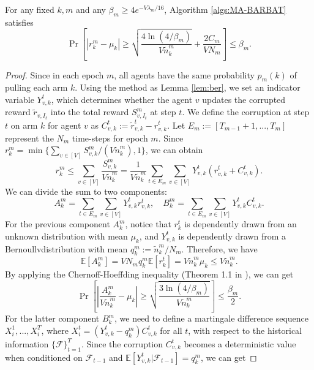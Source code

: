 \begin{lemma}
\label{lem:berm} %
    For any fixed $k,m$ and any $\beta_m \geq 4e^{-V\lambda_m/16}$, Algorithm \ref{algs:MA-BARBAT} satisfies
    \[\Pr\left[|r_k^m - \mu_k| \geq \sqrt{\frac{4\ln(4/\beta_m)}{V \widetilde{n}_k^m}} + \frac{2C_m}{V N_m}\right] \leq \beta_m.\]
\end{lemma}
\begin{proof}
    Since in each epoch $m$, all agents have the same probability $p_m(k)$ of pulling each arm $k$. Using the method as Lemma \ref{lem:ber}, we set an indicator variable $Y_{v,k}^t$, which determines whether the agent $v$ updates the corrupted reward $\widetilde{r}_{v,I_t}$ into the total reward $S_{v,I_t}^m$ at step $t$. We define the corruption at step $t$ on arm $k$ for agent $v$ as $C_{v,k}^t := \widetilde{r}_{v,k}^t - r_{v,k}^t$. Let $E_m := [T_{m-1} + 1,...,T_m]$ represent the $N_m$ time-steps for epoch $m$. Since $r_k^m = \min\{\sum_{v\in [V]}S_{v,k}^m / (V \widetilde{n}_k^m), 1\}$, we can obtain
    \[r_k^m \leq \sum_{v\in [V]}\frac{S_{v,k}^m}{V \widetilde{n}_k^m} = \frac{1}{V \widetilde{n}_k^m}\sum_{t \in E_m}\sum_{v\in [V]}Y_{v,k}^t (r_{v,k}^t + C_{v,k}^t).\]
    We can divide the sum to two components:
    \[A_k^m = \sum_{t \in E_m}\sum_{v\in [V]}Y_{v,k}^t r_{v,k}^t, \quad B_k^m = \sum_{t \in E_m}\sum_{v\in [V]}Y_{v,k}^t C_{v,k}^t.\]
    For the previous component $A_k^m$, notice that $r_k^t$ is dependently drawn from an unknown distribution with mean $\mu_k$, and $Y_{v,k}^t$ is dependently drawn from a Bernoullvdistribution with mean $q_k^m := \widetilde{n}_k^m / N_m$. Therefore, we have
    \[\mathbb{E}[A_k^m] = V N_m q_k^m \mathbb{E}[r_k^t] = V \widetilde{n}_k^m \mu_k \leq V \widetilde{n}_k^m.\]
    By applying the Chernoff-Hoeffding inequality (Theorem 1.1 in \cite{dubhashi2009concentration}), we can get
    \begin{equation}
    \label{eqs:Akmm}
        \Pr\left[\left|\frac{A_k^m}{V \widetilde{n}_k^m} - \mu_k\right|\geq \sqrt{\frac{3\ln(4/\beta_m)}{V \widetilde{n}_k^m}}\right] \leq \frac{\beta_m}{2}.
    \end{equation}
    For the latter component $B_k^m$, we need to define a martingale difference sequence $X_i^1,...,X_i^T$, where $X_i^t = (Y_{v,k}^t - q_k^m) C_{v,k}^t$ for all $t$, with respect to the historical information $\{\mathcal{F}\}_{t=1}^T$. Since the corruption $C_{v,k}^t$ becomes a deterministic value when conditioned on $\mathcal{F}_{t-1}$ and $\mathbb{E}[Y_{v,k}^t | \mathcal{F}_{t-1}] = q_k^m$, we can get

\end{proof}
